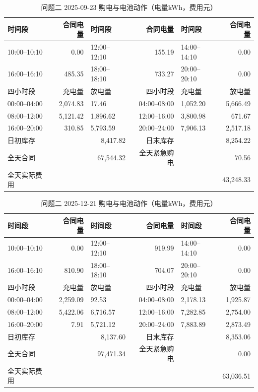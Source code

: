 \begin{table}[H]\centering\small\setlength{\tabcolsep}{4pt}\caption{问题二 2025-09-23 购电与电池动作（电量kWh，费用元）}\begin{tabular}{lrlrlr}\toprule
时间段&合同电量&时间段&合同电量&时间段&合同电量\\\midrule
10:00--10:10 & 0.00 & 12:00--12:10 & 155.19 & 14:00--14:10 & 0.00\\
16:00--16:10 & 485.35 & 18:00--18:10 & 733.27 & 20:00--20:10 & 0.00\\
\midrule 四小时段&充电量&放电量&四小时段&充电量&放电量\\\midrule
00:00--04:00 & 2,074.83 & 17.46 & 04:00--08:00 & 1,052.20 & 5,666.49\\
08:00--12:00 & 5,121.42 & 1,896.62 & 12:00--16:00 & 3,800.98 & 671.67\\
16:00--20:00 & 310.85 & 5,793.59 & 20:00--24:00 & 7,906.13 & 2,517.18\\
\midrule 日初库存 & \multicolumn{2}{r}{8,417.82} & 日末库存 & \multicolumn{2}{r}{8,254.22}\\
全天合同 & \multicolumn{2}{r}{67,544.32} & 全天紧急购电 & \multicolumn{2}{r}{70.56}\\
全天实际费用 & \multicolumn{5}{r}{43,248.33}\\\bottomrule\end{tabular}\end{table}
\begin{table}[H]\centering\small\setlength{\tabcolsep}{4pt}\caption{问题二 2025-12-21 购电与电池动作（电量kWh，费用元）}\begin{tabular}{lrlrlr}\toprule
时间段&合同电量&时间段&合同电量&时间段&合同电量\\\midrule
10:00--10:10 & 0.00 & 12:00--12:10 & 919.99 & 14:00--14:10 & 0.00\\
16:00--16:10 & 810.90 & 18:00--18:10 & 704.07 & 20:00--20:10 & 0.00\\
\midrule 四小时段&充电量&放电量&四小时段&充电量&放电量\\\midrule
00:00--04:00 & 2,259.09 & 92.53 & 04:00--08:00 & 2,178.13 & 1,925.87\\
08:00--12:00 & 5,422.06 & 6,716.57 & 12:00--16:00 & 7,282.85 & 2,754.00\\
16:00--20:00 & 7.91 & 5,721.12 & 20:00--24:00 & 7,883.89 & 2,873.49\\
\midrule 日初库存 & \multicolumn{2}{r}{8,137.60} & 日末库存 & \multicolumn{2}{r}{8,353.06}\\
全天合同 & \multicolumn{2}{r}{97,471.34} & 全天紧急购电 & \multicolumn{2}{r}{0.00}\\
全天实际费用 & \multicolumn{5}{r}{63,036.51}\\\bottomrule\end{tabular}\end{table}